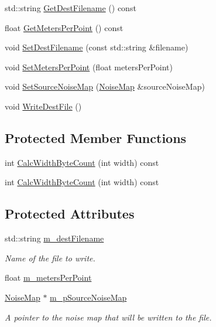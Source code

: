 \begin{DoxyCompactItemize}
std\+::string \hyperlink{classnoise_1_1utils_1_1_writer_t_e_r_a6cbb6d1ef375ab37fa275a8035c5f28e}{Get\+Dest\+Filename} () const 
\item 
float \hyperlink{classnoise_1_1utils_1_1_writer_t_e_r_a320c265c66960fad0a421f0deced0860}{Get\+Meters\+Per\+Point} () const 
\item 
void \hyperlink{classnoise_1_1utils_1_1_writer_t_e_r_af8db9e0a480658949ba8d37f4cb03368}{Set\+Dest\+Filename} (const std\+::string \&filename)
\item 
void \hyperlink{classnoise_1_1utils_1_1_writer_t_e_r_a77f53ea49305858a04ee3cac14d119ec}{Set\+Meters\+Per\+Point} (float meters\+Per\+Point)
\item 
void \hyperlink{classnoise_1_1utils_1_1_writer_t_e_r_a26314e0c188948fa01200a54189c28ca}{Set\+Source\+Noise\+Map} (\hyperlink{classnoise_1_1utils_1_1_noise_map}{Noise\+Map} \&source\+Noise\+Map)
\item 
void \hyperlink{classnoise_1_1utils_1_1_writer_t_e_r_a35a50366223e5f0a18c471099d593a32}{Write\+Dest\+File} ()
\end{DoxyCompactItemize}
\subsection*{Protected Member Functions}
\begin{DoxyCompactItemize}
\item 
int \hyperlink{classnoise_1_1utils_1_1_writer_t_e_r_ac522835cb51dd7fec31699e093c7c89c}{Calc\+Width\+Byte\+Count} (int width) const 
\item 
int \hyperlink{classnoise_1_1utils_1_1_writer_t_e_r_a0cea6c9a943b528940c4ed4f7e744cbb}{Calc\+Width\+Byte\+Count} (int width) const 
\end{DoxyCompactItemize}
\subsection*{Protected Attributes}
\begin{DoxyCompactItemize}
\item 
std\+::string \hyperlink{classnoise_1_1utils_1_1_writer_t_e_r_af272523bc008f77ad2e98f7d6b631bcc}{m\+\_\+dest\+Filename}
\begin{DoxyCompactList}\small\item\em Name of the file to write. \end{DoxyCompactList}\item 
float \hyperlink{classnoise_1_1utils_1_1_writer_t_e_r_a66dd93d28d7157388c2e37dba5c08eff}{m\+\_\+meters\+Per\+Point}
\item 
\hyperlink{classnoise_1_1utils_1_1_noise_map}{Noise\+Map} $\ast$ \hyperlink{classnoise_1_1utils_1_1_writer_t_e_r_ace70be9bceb0ae24ccf86376e189fd97}{m\+\_\+p\+Source\+Noise\+Map}
\begin{DoxyCompactList}\small\item\em A pointer to the noise map that will be written to the file. \end{DoxyCompactList}\end{DoxyCompactItemize}


